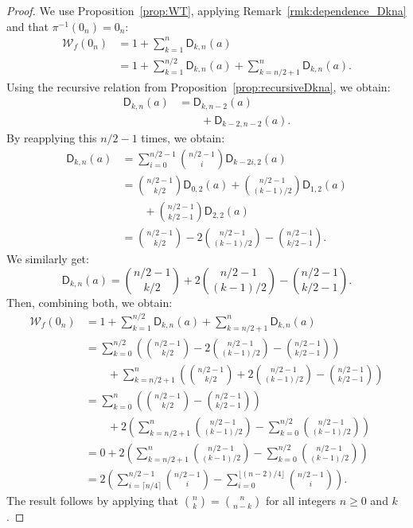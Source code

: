 \documentclass[runningheads,orivec]{llncs}
\newcommand{\Dkna}[3]{\mathsf{D}_{#2,#1}(a)}
\newcommand{\wt}[1]{\mathcal W_{#1}}
\let\geq=\geqslant
\begin{document}
    \begin{proof}
    	We use Proposition~\ref{prop:WT}, applying Remark~\ref{rmk:dependence_Dkna} and that $\pi^{-1}(0_n)=0_n$:
    	\begin{align*}
    		\wt{f}(0_n)&=1+\sum_{k=1}^n\Dkna{n}{k}{\pi^{-1}(0_n)+(0,1,0,1,\ldots,0,1)+\pi(e_k)}\\
    		&=1+\sum_{k=1}^{n/2}\Dkna{n}{k}{1,1,0,1,\ldots,0,1}+\sum_{k=n/2+1}^{n}\Dkna{n}{k}{0,0,0,1,\ldots,0,1}.
    	\end{align*}
    	Using the recursive relation from Proposition~\ref{prop:recursiveDkna}, we obtain:
    	\begin{align*}
    		\Dkna{n}{k}{1,1,0,1,\ldots,0,1}&=\Dkna{n-2}{k}{1,1,0,1,\ldots,0,1}\\
    		&\qquad+\Dkna{n-2}{k-2}{1,1,0,1,\ldots,0,1}.
    	\end{align*}
    	By reapplying this $n/2-1$ times, we obtain:
    	\begin{align*}
    		\Dkna{n}{k}{1,1,0,1,\ldots,0,1}&=\sum_{i=0}^{n/2-1} \binom{n/2-1}{i} \Dkna{2}{k-2i}{1,1}\\
    		&=\binom{n/2-1}{k/2} \Dkna{2}{0}{1,1}+ \binom{n/2-1}{(k-1)/2} \Dkna{2}{1}{1,1}\\
    		&\qquad+ \binom{n/2-1}{k/2-1} \Dkna{2}{2}{1,1}\\
    		&=\binom{n/2-1}{k/2}-2\binom{n/2-1}{(k-1)/2}-\binom{n/2-1}{k/2-1}.
    	\end{align*}
    	We similarly get:
        \[
            \Dkna{n}{k}{0,0,0,1,\ldots,0,1}=\binom{n/2-1}{k/2} +2 \binom{n/2-1}{(k-1)/2}-\binom{n/2-1}{k/2-1}.
        \]
        Then, combining both, we obtain:
    	\begin{align*}
    		\wt{f}(0_n)&=1+\sum_{k=1}^{n/2}\Dkna{n}{k}{1,1,0,1,\ldots,0,1}+ \sum_{k=n/2+1}^{n}\Dkna{n}{k}{0,0,0,1,\ldots,0,1}\\
    		&=\sum_{k=0}^{n/2} \left(\binom{n/2-1}{k/2} -2 \binom{n/2-1}{(k-1)/2}-\binom{n/2-1}{k/2-1}\right)\\
    		&\qquad+\sum_{k=n/2+1}^{n}\left(\binom{n/2-1}{k/2}+2\binom{n/2-1}{(k-1)/2}-\binom{n/2-1}{k/2-1}\right)\\
    		&=\sum_{k=0}^{n}\left( \binom{n/2-1}{k/2}-\binom{n/2-1}{k/2-1}\right)\\
    		&\qquad+2\left(\sum_{k=n/2+1}^{n}\binom{n/2-1}{(k-1)/2}-\sum_{k=0}^{n/2}\binom{n/2-1}{(k-1)/2}\right)\\
    		&=0+2\left(\sum_{k=n/2+1}^{n}\binom{n/2-1}{(k-1)/2}-\sum_{k=0}^{n/2} \binom{n/2-1}{(k-1)/2}\right)\\
            &=2\left(\sum_{i=\lceil n/4\rceil}^{n/2-1} \binom {n/2-1}{i} - \sum_{i=0}^{\lfloor(n-2)/4\rfloor} \binom{n/2-1}{i}\right).
    	\end{align*}
    	The result follows by applying that $\binom{n}{k}=\binom{n}{n-k}$ for all integers $n\geq 0$ and $k$.
    \end{proof}
    
\end{document}
